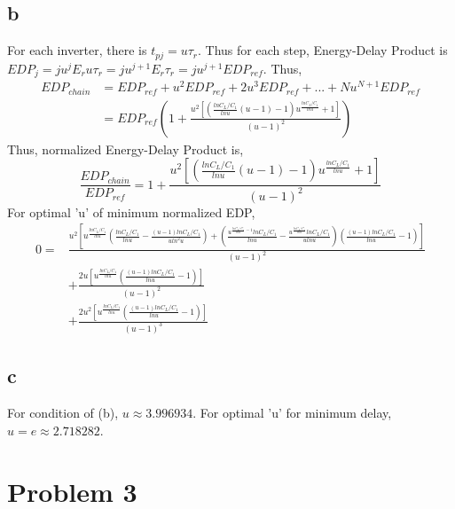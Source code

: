 \documentclass[a4paper,10pt]{article}
\begin{document}
\subsection*{b}
For each inverter, there is \begin{math}t_{pj} = u\tau_r\end{math}. Thus for each step, Energy-Delay Product is 
\begin{math} EDP_j = ju^j E_r u \tau_r = ju^{j+1} E_r \tau_r = ju^{j+1} EDP_{ref}\end{math}. Thus,
\begin{equation}
\begin{split}
  EDP_{chain} &= EDP_{ref} + u^2 EDP_{ref} + 2u^3 EDP_{ref} + ... + Nu^{N+1} EDP_{ref}\\
  &= EDP_{ref} (1+\frac{u^2[(\frac{ln C_L /C_1}{ln u} (u-1)-1)u^{\frac{ln C_L/C_1}{ln u}} +1]}{(u-1)^2})
\end{split}
\end{equation}
Thus, normalized Energy-Delay Product is,
\begin{equation}
 \frac{EDP_{chain}}{EDP_{ref}} = 1+\frac{u^2[(\frac{ln C_L /C_1}{ln u} (u-1)-1)u^{\frac{ln C_L/C_1}{ln u}} +1]}{(u-1)^2}
\end{equation}
For optimal 'u' of minimum normalized EDP,
\begin{equation}
\begin{split}
 0=&\frac{u^2 [u^{\frac{ln C_L/C_1}{ln u}}(\frac{ln C_L/C_1}{ln u}-\frac{(u-1)ln C_L/C_1}{uln^2 u})+(\frac{u^{\frac{ln C_L/C_1}{ln u}-1}ln C_L/C_1}{ln u}-\frac{u^{\frac{ln C_L/C_1}{ln u}}ln C_L/C_1}{uln u})(\frac{(u-1)ln C_L/C_1}{ln u}-1)]}{(u-1)^2}\\
 &+\frac{2u[u^{\frac{ln C_L/C_1}{ln u}}(\frac{(u-1)ln C_L/C_1}{ln u}-1)]}{(u-1)^2}\\
 &+\frac{2u^2[u^{\frac{ln C_L/C_1}{ln u}}(\frac{(u-1)ln C_L/C_1}{ln u}-1)]}{(u-1)^3}
\end{split}
\end{equation}
\subsection*{c}
For condition of (b), \begin{math}u\approx 3.996934\end{math}. For optimal 'u' for minimum delay, \begin{math}u=e\approx 2.718282\end{math}.
\section*{Problem 3}
\end{document}
